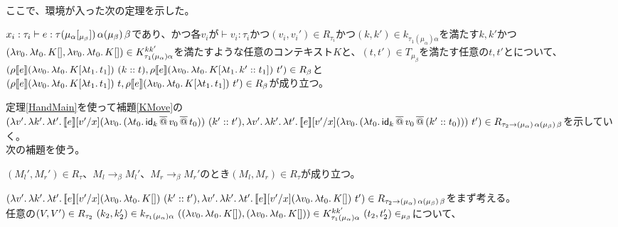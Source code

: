 \\
ここで、環境が入った次の定理を示した。
\begin{theorem}
  $x_i:\tau_i \vdash e:\tau \TrailsType{\alpha}{\beta} \TrailType{\beta}$であり、かつ各$v_i$が$\vdash v_i:\tau_i$かつ$(v_i,v_i') \in R_{\tau_i}$かつ$(k,k')\in k_{\tau_1(\mu_{\alpha})\alpha}$を満たす$k,k'$かつ$(\Lam{v_0}{\Lam{t_0}{K[]}}, \Lam{v_0}{\Lam{t_0}{K[]}})\in  K^{kk'}_{\tau_1(\mu_{\alpha})\alpha}$を満たすような任意のコンテキスト$K$と、$(t, t') \in T_{\mu_{\beta}}$を満たす任意の$t, t'$とについて、\\
  $(\rho \CPSTh{e} \LamP{v_0}{\Lam{t_0}{K[\Lam{t_1}{t_1}]}}\ \ConsP{k}{t}, \rho \CPSTh{e} \LamP{v_0}{\Lam{t_0}{K[\Lam{t_1}{\Cons{k'}{t_1}}]}}\ t')\in R_{\beta}$と\\
  $(\rho \CPSTh{e} \LamP{v_0}{\Lam{t_0}{K[\Lam{t_1}{t_1}]}}\ t, \rho \CPSTh{e} \LamP{v_0}{\Lam{t_0}{K[\Lam{t_1}{t_1}]}}\ t')\in R_{\beta}$が成り立つ。
\label{HandMain}
\end{theorem}
定理\ref{HandMain}を使って補題\ref{KMove}の\\
$(\Lam{v'}{\Lam{k'}{\Lam{t'}{\CPSTh{e}[\Change{x}{v'}] \LamP{v_0}{\LamP{t_0}{\SApp{\Idk}{\SApp{v_0}{t_0}}}}\ \ConsP{k'}{t'}}}},\\
\Lam{v'}{\Lam{k'}{\Lam{t'}{\CPSTh{e}[\Change{x}{v'}] \LamP{v_0}{\LamP{t_0}{\SApp{\Idk}{\SApp{v_0}{\ConsP{k'}{t_0}}}}}\ t'}}})
\in R_{\tau_2 \rightarrow \TrailType{\alpha} \TrailType{\beta}}$を示していく。\\
次の補題を使う。\\
\begin{lemma}[簡約と論理関係の保存]
  $(M_l', M_r') \in R_{\tau}、M_l \rightarrow_{\beta} M_l'、M_r \rightarrow_{\beta} M_r'$のとき$(M_l, M_r) \in R_{\tau}$が成り立つ。
\label{Reduction2}
\end{lemma}
$(\Lam{v'}{\Lam{k'}{\Lam{t'}{\CPSTh{e}[\Change{x}{v'}] \LamP{v_0}{\Lam{t_0}{K[]}}\ \ConsP{k'}{t'}}}},\\
\Lam{v'}{\Lam{k'}{\Lam{t'}{\CPSTh{e}[\Change{x}{v'}] \LamP{v_0}{\Lam{t_0}{K[]}}\ t'}}})
\in R_{\tau_2 \rightarrow \TrailType{\alpha} \TrailType{\beta}}$をまず考える。
\\
任意の$(V,V')\in R_{\tau_2}\  (k_2,k_2')\in k_{\tau_1(\mu_{\alpha})\alpha}\  (\LamP{v_0}{\Lam{t_0}{K[]}},\LamP{v_0}{\Lam{t_0}{K[]}})\in K^{kk'}_{\tau_1(\mu_{\alpha})\alpha}\  (t_2,t_2')\in_{\mu_{\beta}}$について、\\
